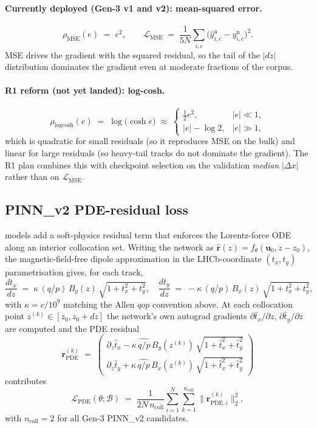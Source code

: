 \documentclass[11pt,a4paper]{article}
\newcommand{\file}[1]{\texttt{\detokenize{#1}}}
\begin{document}
\paragraph{Currently deployed (Gen-3 v1 and v2): mean-squared error.}
\[
  \rho_{\mathrm{MSE}}(e) \;=\; e^{2},
  \qquad
  \mathcal{L}_{\mathrm{MSE}}
  \;=\; \frac{1}{5N}\sum_{i,c}\bigl(\hat{y}^{\mathrm{n}}_{i,c}-y^{\mathrm{n}}_{i,c}\bigr)^{2}.
\]
MSE drives the gradient with the squared residual, so the tail of the
$|dz|$ distribution dominates the gradient even at moderate fractions
of the corpus.

\paragraph{R1 reform (not yet landed): log-cosh.}
\[
  \rho_{\mathrm{logcosh}}(e) \;=\; \log\!\bigl(\cosh e\bigr)
  \;\approx\;\begin{cases} \tfrac{1}{2}e^{2}, & |e|\ll 1, \\ |e|-\log 2, & |e|\gg 1, \end{cases}
\]
which is quadratic for small residuals (so it reproduces MSE on the
bulk) and linear for large residuals (so heavy-tail tracks do not
dominate the gradient). The R1 plan combines this with checkpoint
selection on the validation \emph{median} $|\Delta x|$ rather than on
$\mathcal{L}_{\mathrm{MSE}}$.

\subsection{PINN\_v2 PDE-residual loss}

\file{pinn_v2_*} models add a soft-physics residual term that
enforces the Lorentz-force ODE along an interior collocation set.
Writing the network as $\hat{\mathbf{r}}(z)=f_\theta(\mathbf{u}_0,z-z_0)$,
the magnetic-field-free dipole approximation in the LHCb-coordinate
$(t_x,t_y)$ parametrisation gives, for each track,
\[
  \frac{d t_x}{dz} \;=\; \kappa\,(q/p)\,B_y(z)\,\sqrt{1+t_x^{2}+t_y^{2}},
  \quad
  \frac{d t_y}{dz} \;=\; -\kappa\,(q/p)\,B_x(z)\,\sqrt{1+t_x^{2}+t_y^{2}},
\]
with $\kappa=c/10^{9}$ matching the Allen $qop$ convention above. At
each collocation point $z^{(k)}\in[z_0,z_0+dz]$ the network's own
autograd gradients
$\partial \hat{t}_x/\partial z$, $\partial \hat{t}_y/\partial z$
are computed and the PDE residual
\[
  \mathbf{r}^{(k)}_{\mathrm{PDE}}
  \;=\; \begin{pmatrix}
    \partial_z \hat t_x - \kappa\,\widehat{q/p}\,B_y(z^{(k)})\,\sqrt{1+\hat t_x^{2}+\hat t_y^{2}}\\[2pt]
    \partial_z \hat t_y + \kappa\,\widehat{q/p}\,B_x(z^{(k)})\,\sqrt{1+\hat t_x^{2}+\hat t_y^{2}}
  \end{pmatrix}
\]
contributes
\[
  \mathcal{L}_{\mathrm{PDE}}(\theta;\mathcal{B})
  \;=\; \frac{1}{2 N\, n_{\mathrm{coll}}}\sum_{i=1}^{N}\sum_{k=1}^{n_{\mathrm{coll}}}\bigl\lVert\mathbf{r}^{(k)}_{\mathrm{PDE},i}\bigr\rVert_{2}^{2},
\]
with $n_{\mathrm{coll}}=2$ for all Gen-3 PINN\_v2 candidates.
\end{document}
